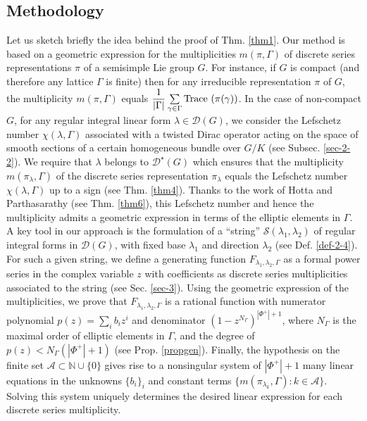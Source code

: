 \documentclass[11 pt]{amsart}
\newcommand{\N}{{\mathbb N}}
\newcommand{\Tr}{{\rm Trace~}}
\theoremstyle{definition}
\numberwithin{equation}{section}
\begin{document}
\subsection{Methodology}
Let us sketch briefly the idea behind the proof of Thm. \ref{thm1}. Our method is based on a geometric expression for the multiplicities $m(\pi, \Gamma)$ of discrete series representations $\pi$ of a semisimple Lie group $G$. For instance, if $G$ is compact (and therefore any lattice $\Gamma$ is finite) then for any irreducible representation $\pi$ of $G$, the multiplicity $m(\pi, \Gamma)$ equals $\dfrac{1}{|\Gamma|} \sum\limits_{\gamma \in \Gamma} \Tr (\pi (\gamma))$. In the case of non-compact $G$, for any regular integral linear form $\lambda \in \mathcal{D}(G)$, we consider the Lefschetz number $\chi(\lambda, \Gamma)$ associated with a twisted Dirac operator acting on the space of smooth sections of a certain homogeneous bundle over $G/K$ (see Subsec. \ref{sec-2-2}). We require that $\lambda$ belongs to $\mathcal{D}^{\star}(G)$ which ensures that the multiplicity $m(\pi_{\lambda}, \Gamma)$ of the discrete series representation $\pi_{\lambda}$ equals the Lefschetz number $\chi(\lambda, \Gamma)$ up to a sign (see Thm. \ref{thm4}). Thanks to the work of Hotta and Parthasarathy (see Thm. \ref{thm6}), this Lefschetz number and hence the multiplicity admits a geometric expression in terms of the elliptic elements in $\Gamma$. A key tool in our approach is the formulation of a ``string'' $\mathcal{S}(\lambda_1, \lambda_2)$ of regular integral forms in $\mathcal{D}(G)$, with fixed base $\lambda_1$ and direction $\lambda_2$ (see Def. \ref{def-2-4}). For such a given string, we define a generating function $F_{\lambda_1, \lambda_2, \Gamma}$ as a formal power series in the complex variable $z$ with coefficients as discrete series multiplicities associated to the string (see Sec. \ref{sec-3}). Using the geometric expression of the multiplicities, we prove that $F_{\lambda_1, \lambda_2, \Gamma}$ is a rational function with numerator polynomial $p(z)=\sum\limits_i b_i z^i$ and denominator $(1-z^{N_{\Gamma}})^{|\Phi^+| +1}$, where $N_{\Gamma}$ is the maximal order of elliptic elements in $\Gamma$, and the degree of $p(z) < N_{\Gamma} ( |\Phi^+| + 1)$ (see Prop. \ref{propgen}). Finally, the hypothesis on the finite set $\mathcal{A} \subset \N \cup \{0\}$ gives rise to a nonsingular system of $|\Phi^+| +1$ many linear equations in the unknowns $\{ b_i \}_i$ and constant terms $\{m(\pi_{\lambda_k}, \Gamma) : k \in \mathcal{A} \}$. Solving this system uniquely determines the desired linear expression for each discrete series multiplicity.
\end{document}

